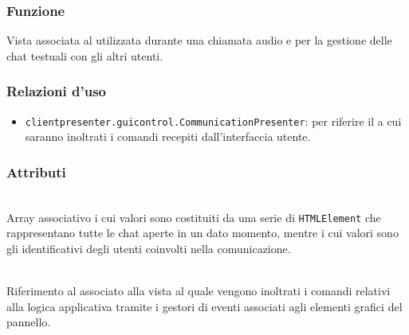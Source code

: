 \subsubsection*{Funzione}
Vista associata al   utilizzata durante una chiamata audio e per la gestione delle chat testuali con gli altri utenti.

\subsubsection*{Relazioni d'uso}
\begin{itemize}
  \item \texttt{clientpresenter.guicontrol.CommunicationPresenter}: per riferire il  a cui saranno inoltrati i comandi recepiti dall'interfaccia utente.
\end{itemize}

\subsubsection*{Attributi}
\begin{description}

  \item{}\\
  Array associativo i cui valori sono costituiti da una serie di \verb'HTMLElement' che rappresentano tutte le chat aperte in un dato momento, mentre i cui valori sono gli identificativi degli utenti coinvolti nella comunicazione.

  \item{}\\
  Riferimento al  associato alla vista al quale vengono inoltrati i comandi relativi alla logica applicativa tramite i gestori di eventi associati agli elementi grafici del pannello.
\end{description}

